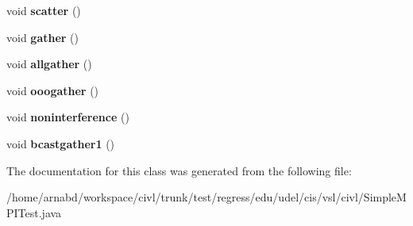 \begin{DoxyCompactItemize}
\item 
\hypertarget{classedu_1_1udel_1_1cis_1_1vsl_1_1civl_1_1SimpleMPITest_ad92ef483ae3d356cecffd19efe085657}{}void {\bfseries scatter} ()\label{classedu_1_1udel_1_1cis_1_1vsl_1_1civl_1_1SimpleMPITest_ad92ef483ae3d356cecffd19efe085657}

\item 
\hypertarget{classedu_1_1udel_1_1cis_1_1vsl_1_1civl_1_1SimpleMPITest_a9e0aca06c81c4b405014c070d25f453f}{}void {\bfseries gather} ()\label{classedu_1_1udel_1_1cis_1_1vsl_1_1civl_1_1SimpleMPITest_a9e0aca06c81c4b405014c070d25f453f}

\item 
\hypertarget{classedu_1_1udel_1_1cis_1_1vsl_1_1civl_1_1SimpleMPITest_a952c946e34c696bb111850eb53773285}{}void {\bfseries allgather} ()\label{classedu_1_1udel_1_1cis_1_1vsl_1_1civl_1_1SimpleMPITest_a952c946e34c696bb111850eb53773285}

\item 
\hypertarget{classedu_1_1udel_1_1cis_1_1vsl_1_1civl_1_1SimpleMPITest_a2c14e2d5a22a2fff701aa0ca8433be9d}{}void {\bfseries ooogather} ()\label{classedu_1_1udel_1_1cis_1_1vsl_1_1civl_1_1SimpleMPITest_a2c14e2d5a22a2fff701aa0ca8433be9d}

\item 
\hypertarget{classedu_1_1udel_1_1cis_1_1vsl_1_1civl_1_1SimpleMPITest_abfa615470ac9b36504f39504108301d4}{}void {\bfseries noninterference} ()\label{classedu_1_1udel_1_1cis_1_1vsl_1_1civl_1_1SimpleMPITest_abfa615470ac9b36504f39504108301d4}

\item 
\hypertarget{classedu_1_1udel_1_1cis_1_1vsl_1_1civl_1_1SimpleMPITest_a2cfac6b0fb613d34239d8637555a0f54}{}void {\bfseries bcastgather1} ()\label{classedu_1_1udel_1_1cis_1_1vsl_1_1civl_1_1SimpleMPITest_a2cfac6b0fb613d34239d8637555a0f54}

\end{DoxyCompactItemize}


The documentation for this class was generated from the following file\+:\begin{DoxyCompactItemize}
\item 
/home/arnabd/workspace/civl/trunk/test/regress/edu/udel/cis/vsl/civl/Simple\+M\+P\+I\+Test.\+java\end{DoxyCompactItemize}
